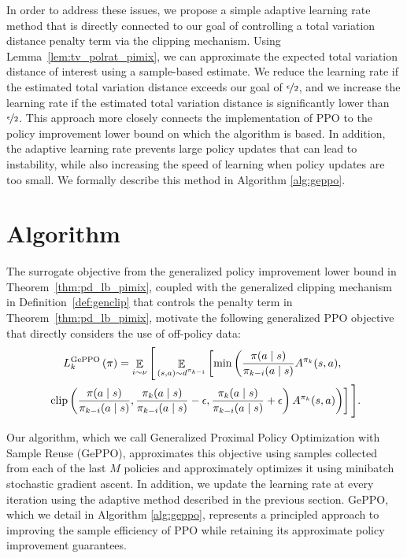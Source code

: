 \documentclass{article}
\begin{document}
In order to address these issues, we propose a simple adaptive learning rate method that is directly connected to our goal of controlling a total variation distance penalty term via the clipping mechanism. Using Lemma~\ref{lem:tv_polrat_pimix}, we can approximate the expected total variation distance of interest using a sample-based estimate. We reduce the learning rate if the estimated total variation distance exceeds our goal of $\nicefrac{\epsilon}{2}$, and we increase the learning rate if the estimated total variation distance is significantly lower than $\nicefrac{\epsilon}{2}$. This approach more closely connects the implementation of PPO to the policy improvement lower bound on which the algorithm is based. In addition, the adaptive learning rate prevents large policy updates that can lead to instability, while also increasing the speed of learning when policy updates are too small. We formally describe this method in Algorithm \ref{alg:geppo}.


\section{Algorithm}

The surrogate objective from the generalized policy improvement lower bound in Theorem~\ref{thm:pd_lb_pimix}, coupled with the generalized clipping mechanism in Definition~\ref{def:genclip} that controls the penalty term in Theorem~\ref{thm:pd_lb_pimix}, motivate the following generalized PPO objective that directly considers the use of off-policy data:
\begin{multline}\label{eq:geppo_loss}
L^{\textnormal{GePPO}}_k \left( \pi \right) = \mathop{\mathbb{E}}_{i \sim \nu} \Bigg[ \mathop{\mathbb{E}}_{(s,a) \sim d^{\pi_{k-i}}} \left[ \min \left(  \frac{\pi(a \mid s)}{\pi_{k-i}(a \mid s)} A^{\pi_k}(s,a), \right. \right. \\ \left. \left.  \operatorname{clip}\left( \frac{\pi(a \mid s)}{\pi_{k-i}(a \mid s)},\frac{\pi_k(a \mid s)}{\pi_{k-i}(a \mid s)}-\epsilon,\frac{\pi_k(a \mid s)}{\pi_{k-i}(a \mid s)}+\epsilon \right) A^{\pi_k}(s,a) \right) \right] \Bigg].
\end{multline}

Our algorithm, which we call Generalized Proximal Policy Optimization with Sample Reuse (GePPO), approximates this objective using samples collected from each of the last $M$ policies and approximately optimizes it using minibatch stochastic gradient ascent. In addition, we update the learning rate at every iteration using the adaptive method described in the previous section. GePPO, which we detail in Algorithm \ref{alg:geppo}, represents a principled approach to improving the sample efficiency of PPO while retaining its approximate policy improvement guarantees.
\end{document}
